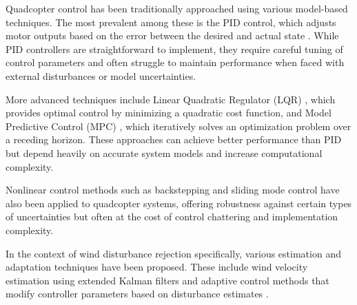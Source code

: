 \documentclass[12pt]{article}
\begin{document}
Quadcopter control has been traditionally approached using various model-based techniques. The most prevalent among these is the PID control, which adjusts motor outputs based on the error between the desired and actual state \cite{bouabdallah2004pid}. While PID controllers are straightforward to implement, they require careful tuning of control parameters and often struggle to maintain performance when faced with external disturbances or model uncertainties.


More advanced techniques include Linear Quadratic Regulator (LQR) \cite{chitsaz2011lqr}, which provides optimal control by minimizing a quadratic cost function, and Model Predictive Control (MPC) \cite{alexis2011mpc}, which iteratively solves an optimization problem over a receding horizon. These approaches can achieve better performance than PID but depend heavily on accurate system models and increase computational complexity.


Nonlinear control methods such as backstepping \cite{madani2006backstepping} and sliding mode control \cite{xu2006slidingmode} have also been applied to quadcopter systems, offering robustness against certain types of uncertainties but often at the cost of control chattering and implementation complexity.


In the context of wind disturbance rejection specifically, various estimation and adaptation techniques have been proposed. These include wind velocity estimation using extended Kalman filters \cite{balas2018disturbance} and adaptive control methods that modify controller parameters based on disturbance estimates \cite{wang2016adaptive}.

\end{document}
